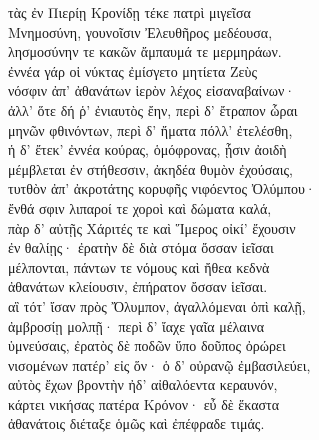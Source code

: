 \begin{pages}
\begin{Leftside}
\quad{}τὰς ἐν Πιερίῃ Κρονίδῃ τέκε πατρὶ μιγεῖσα\\
Μνημοσύνη, γουνοῖσιν Ἐλευθῆρος μεδέουσα,\\
λησμοσύνην τε κακῶν ἄμπαυμά τε μερμηράων. \\
ἐννέα γάρ οἱ νύκτας ἐμίσγετο μητίετα Ζεὺς\\
νόσφιν ἀπ' ἀθανάτων ἱερὸν λέχος εἰσαναβαίνων·\\
ἀλλ' ὅτε δή ῥ' ἐνιαυτὸς ἔην, περὶ δ' ἔτραπον ὧραι\\
μηνῶν φθινόντων, περὶ δ' ἤματα πόλλ' ἐτελέσθη,\\
ἡ δ' ἔτεκ' ἐννέα κούρας, ὁμόφρονας, ᾗσιν ἀοιδὴ  \\
μέμβλεται ἐν στήθεσσιν, ἀκηδέα θυμὸν ἐχούσαις,\\
τυτθὸν ἀπ' ἀκροτάτης κορυφῆς νιφόεντος Ὀλύμπου·\\
ἔνθά σφιν λιπαροί τε χοροὶ καὶ δώματα καλά,\\
πὰρ δ' αὐτῇς Χάριτές τε καὶ Ἵμερος οἰκί' ἔχουσιν\\
ἐν θαλίῃς· ἐρατὴν δὲ διὰ στόμα ὄσσαν ἱεῖσαι  \\
μέλπονται, πάντων τε νόμους καὶ ἤθεα κεδνὰ \\
ἀθανάτων κλείουσιν, ἐπήρατον ὄσσαν ἱεῖσαι.\\
αἳ τότ' ἴσαν πρὸς Ὄλυμπον, ἀγαλλόμεναι ὀπὶ καλῇ, \\
ἀμβροσίῃ μολπῇ· περὶ δ' ἴαχε γαῖα μέλαινα \\
ὑμνεύσαις, ἐρατὸς δὲ ποδῶν ὕπο δοῦπος ὀρώρει \\
νισομένων πατέρ' εἰς ὅν· ὁ δ' οὐρανῷ ἐμβασιλεύει, \\
αὐτὸς ἔχων βροντὴν ἠδ' αἰθαλόεντα κεραυνόν,\\
κάρτει νικήσας πατέρα Κρόνον· εὖ δὲ ἕκαστα \\
ἀθανάτοις διέταξε ὁμῶς καὶ ἐπέφραδε τιμάς.\\


\end{Leftside}
\end{pages}
